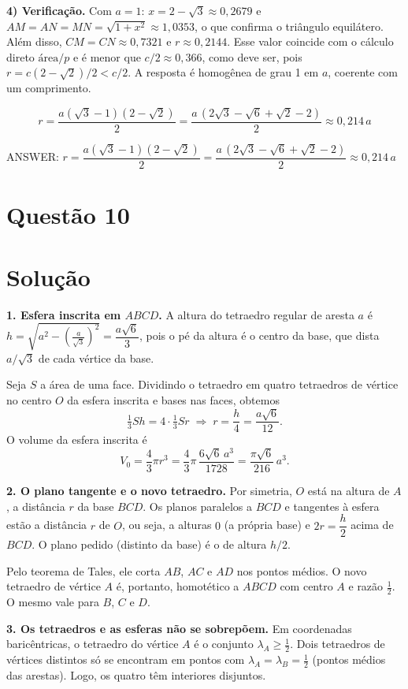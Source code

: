 \documentclass{article}%
\begin{document}
\textbf{4) Verificação.} Com $a=1$: $x=2-\sqrt3\approx0{,}2679$ e $AM=AN=MN=\sqrt{1+x^2}\approx1{,}0353$, o que confirma o triângulo equilátero. Além disso, $CM=CN\approx0{,}7321$ e $r\approx0{,}2144$. Esse valor coincide com o cálculo direto $\text{área}/p$ e é menor que $c/2\approx0{,}366$, como deve ser, pois $r=c(2-\sqrt2)/2<c/2$. A resposta é homogênea de grau 1 em $a$, coerente com um comprimento.

\[
\boxed{\,r=\dfrac{a(\sqrt3-1)(2-\sqrt2)}{2}=\dfrac{a\,(2\sqrt3-\sqrt6+\sqrt2-2)}{2}\approx 0{,}214\,a\,}
\]

ANSWER: $r=\dfrac{a(\sqrt3-1)(2-\sqrt2)}{2}=\dfrac{a\,(2\sqrt3-\sqrt6+\sqrt2-2)}{2}\approx 0{,}214\,a$%
\newpage%
\section*{Questão 10}

\section*{Solução}

\textbf{1. Esfera inscrita em $ABCD$.}
A altura do tetraedro regular de aresta $a$ é $h=\sqrt{a^{2}-\left(\tfrac{a}{\sqrt3}\right)^{2}}=\dfrac{a\sqrt6}{3}$, pois o pé da altura é o centro da base, que dista $a/\sqrt3$ de cada vértice da base.

Seja $S$ a área de uma face. Dividindo o tetraedro em quatro tetraedros de vértice no centro $O$ da esfera inscrita e bases nas faces, obtemos
\[
\tfrac13 S h=4\cdot\tfrac13 S r \;\Longrightarrow\; r=\frac h4=\frac{a\sqrt6}{12}.
\]
O volume da esfera inscrita é
\[
V_0=\frac43\pi r^{3}=\frac43\pi\,\frac{6\sqrt6\,a^{3}}{1728}=\frac{\pi\sqrt6}{216}\,a^{3}.
\]

\textbf{2. O plano tangente e o novo tetraedro.}
Por simetria, $O$ está na altura de $A$, a distância $r$ da base $BCD$. Os planos paralelos a $BCD$ e tangentes à esfera estão a distância $r$ de $O$, ou seja, a alturas $0$ (a própria base) e $2r=\dfrac h2$ acima de $BCD$. O plano pedido (distinto da base) é o de altura $h/2$.

Pelo teorema de Tales, ele corta $AB$, $AC$ e $AD$ nos pontos médios. O novo tetraedro de vértice $A$ é, portanto, homotético a $ABCD$ com centro $A$ e razão $\tfrac12$. O mesmo vale para $B$, $C$ e $D$.

\textbf{3. Os tetraedros e as esferas não se sobrepõem.}
Em coordenadas baricêntricas, o tetraedro do vértice $A$ é o conjunto $\lambda_A\ge \tfrac12$. Dois tetraedros de vértices distintos só se encontram em pontos com $\lambda_A=\lambda_B=\tfrac12$ (pontos médios das arestas). Logo, os quatro têm interiores disjuntos.
\end{document}
